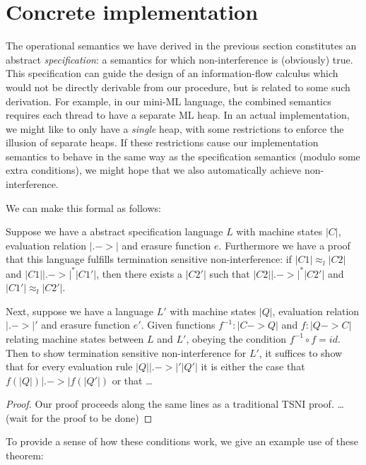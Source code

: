 \section{Concrete implementation}
\label{sec:concrete}

The operational semantics we have derived in the previous section
constitutes an abstract \emph{specification}: a semantics for which
non-interference is (obviously) true.  This specification can guide the
design of an information-flow calculus which would not be directly
derivable from our procedure, but is related to some such derivation.
For example, in our mini-ML language, the combined semantics requires
each thread to have a separate ML heap.  In an actual implementation, we
might like to only have a \emph{single} heap, with some restrictions to
enforce the illusion of separate heaps.  If these restrictions cause our
implementation semantics to behave in the same way as the specification
semantics (modulo some extra conditions), we might hope that we also
automatically achieve non-interference.

We can make this formal as follows: 

\begin{theorem}
    Suppose we have a abstract specification language $L$ with machine
    states $|C|$, evaluation relation $|.->|$ and erasure function $e$.
    Furthermore we have a proof that this language fulfills termination
    sensitive non-interference: if $|C1| \approx_l |C2|$ and $|C1|
    |.->|^* |C1'|$, then there exists a $|C2'|$ such that $|C2| |.->|^*
    |C2'|$ and $|C1'| \approx_l |C2'|$.

    Next, suppose we have a language $L'$ with machine states $|Q|$,
    evaluation relation $|.->|'$ and erasure function $e'$.  Given
    functions $f^{-1} : |C -> Q|$ and $f : |Q -> C|$ relating machine
    states between $L$ and $L'$, obeying the condition $f^{-1} \circ f =
    id$.  Then to show termination sensitive non-interference for $L'$,
    it suffices to show that for every evaluation rule $|Q| |.->|' |Q'|$
    it is either the case that $f(|Q|) |.->| f(|Q'|)$ or that
    \ldots
\end{theorem}

\begin{proof}
Our proof proceeds along the same lines as a traditional TSNI proof.
\ldots (wait for the proof to be done)
\end{proof}

To provide a sense of how these conditions work, we give an example
use of these theorem:

